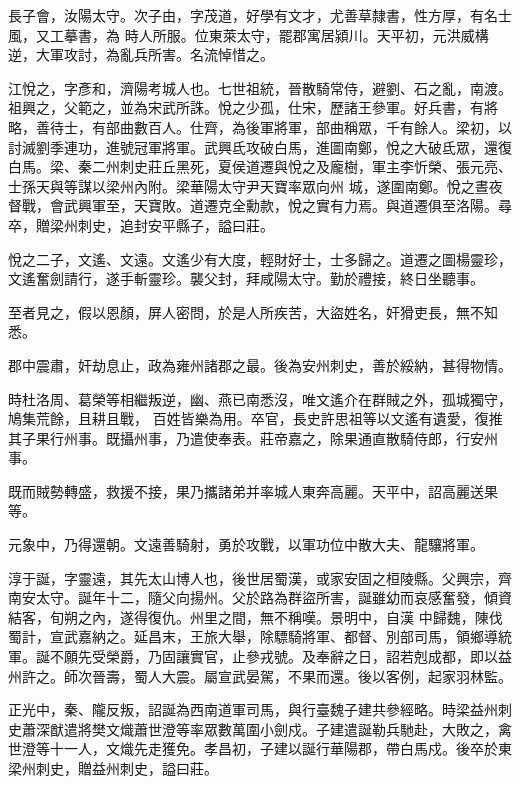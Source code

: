 \begin{pinyinscope}
 長子會，汝陽太守。次子由，字茂道，好學有文才，尤善草隸書，性方厚，有名士風，又工摹書，為
 時人所服。位東萊太守，罷郡寓居潁川。天平初，元洪威構逆，大軍攻討，為亂兵所害。名流悼惜之。



 江悅之，字彥和，濟陽考城人也。七世祖統，晉散騎常侍，避劉、石之亂，南渡。祖興之，父範之，並為宋武所誅。悅之少孤，仕宋，歷諸王參軍。好兵書，有將略，善待士，有部曲數百人。仕齊，為後軍將軍，部曲稱眾，千有餘人。梁初，以討滅劉季連功，進號冠軍將軍。武興氐攻破白馬，進圖南鄭，悅之大破氐眾，還復白馬。梁、秦二州刺史莊丘黑死，夏侯道遷與悅之及龐樹，軍主李忻榮、張元亮、士孫天與等謀以梁州內附。梁華陽太守尹天寶率眾向州
 城，遂圍南鄭。悅之晝夜督戰，會武興軍至，天寶敗。道遷克全勳款，悅之實有力焉。與道遷俱至洛陽。尋卒，贈梁州刺史，追封安平縣子，謚曰莊。



 悅之二子，文遙、文遠。文遙少有大度，輕財好士，士多歸之。道遷之圖楊靈珍，文遙奮劍請行，遂手斬靈珍。襲父封，拜咸陽太守。勤於禮接，終日坐聽事。



 至者見之，假以恩顏，屏人密問，於是人所疾苦，大盜姓名，奸猾吏長，無不知悉。



 郡中震肅，奸劫息止，政為雍州諸郡之最。後為安州刺史，善於綏納，甚得物情。



 時杜洛周、葛榮等相繼叛逆，幽、燕已南悉沒，唯文遙介在群賊之外，孤城獨守，鳩集荒餘，且耕且戰，
 百姓皆樂為用。卒官，長史許思祖等以文遙有遺愛，復推其子果行州事。既攝州事，乃遣使奉表。莊帝嘉之，除果通直散騎侍郎，行安州事。



 既而賊勢轉盛，救援不接，果乃攜諸弟并率城人東奔高麗。天平中，詔高麗送果等。



 元象中，乃得還朝。文遠善騎射，勇於攻戰，以軍功位中散大夫、龍驤將軍。



 淳于誕，字靈遠，其先太山博人也，後世居蜀漢，或家安固之桓陵縣。父興宗，齊南安太守。誕年十二，隨父向揚州。父於路為群盜所害，誕雖幼而哀感奮發，傾資結客，旬朔之內，遂得復仇。州里之間，無不稱嘆。景明中，自漢
 中歸魏，陳伐蜀計，宣武嘉納之。延昌末，王旅大舉，除驃騎將軍、都督、別部司馬，領鄉導統軍。誕不願先受榮爵，乃固讓實官，止參戎號。及奉辭之日，詔若剋成都，即以益州許之。師次晉壽，蜀人大震。屬宣武晏駕，不果而還。後以客例，起家羽林監。



 正光中，秦、隴反叛，詔誕為西南道軍司馬，與行臺魏子建共參經略。時梁益州刺史蕭深猷遣將樊文熾蕭世澄等率眾數萬圍小劍戍。子建遣誕勒兵馳赴，大敗之，禽世澄等十一人，文熾先走獲免。孝昌初，子建以誕行華陽郡，帶白馬戍。後卒於東梁州刺史，贈益州刺史，謚曰莊。




\end{pinyinscope}
